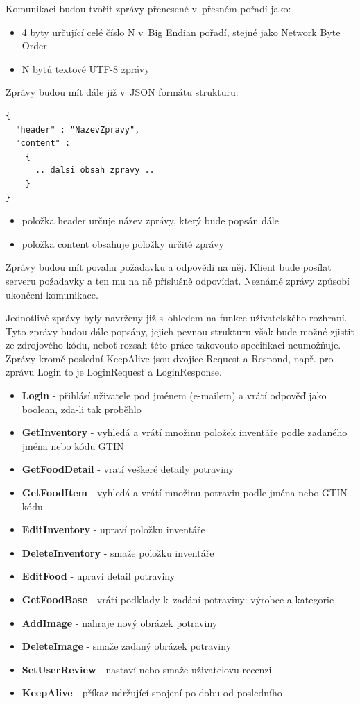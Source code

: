 \documentclass[thesis=B,czech]{FITthesis}[2013/10/20]
\begin{document}
Komunikaci budou tvořit zprávy přenesené v~přesném pořadí jako:

\begin{itemize}
  \item{4 byty určující celé číslo N v~Big Endian pořadí, stejné jako Network Byte Order}
  \item{N bytů textové UTF-8 zprávy}
\end{itemize}

Zprávy budou mít dále již v~JSON formátu strukturu:
\begin{lstlisting}
{
  "header" : "NazevZpravy",
  "content" :
    {
      .. dalsi obsah zpravy ..
    }
}
\end{lstlisting}

\begin{itemize}
  \item{položka header určuje název zprávy, který bude popsán dále}
  \item{položka content obsahuje položky určité zprávy}
\end{itemize}

Zprávy budou mít povahu požadavku a odpovědi na něj. Klient bude posílat serveru požadavky a ten mu na ně příslušně odpovídat. Neznámé zprávy způsobí ukončení komunikace.

Jednotlivé zprávy byly navrženy již s~ohledem na funkce uživatelského rozhraní. Tyto zprávy budou dále popsány, jejich pevnou strukturu však bude možné zjistit ze zdrojového kódu, neboť rozsah této práce takovouto specifikaci neumožňuje. Zprávy kromě poslední KeepAlive jsou dvojice Request a Respond, např. pro zprávu Login to je LoginRequest a LoginResponse.

\begin{itemize}
  \item{\textbf{Login} - přihlásí uživatele pod jménem (e-mailem) a vrátí odpověď jako boolean, zda-li tak proběhlo}
  \item{\textbf{GetInventory} - vyhledá a vrátí množinu položek inventáře podle zadaného jména nebo kódu GTIN}
  \item{\textbf{GetFoodDetail} - vratí veškeré detaily potraviny}
  \item{\textbf{GetFoodItem} - vyhledá a vrátí množinu potravin podle jména nebo GTIN kódu}
  \item{\textbf{EditInventory} - upraví položku inventáře}
  \item{\textbf{DeleteInventory} - smaže položku inventáře}
  \item{\textbf{EditFood} - upraví detail potraviny}
  \item{\textbf{GetFoodBase} - vrátí podklady k~zadání potraviny: výrobce a kategorie}
  \item{\textbf{AddImage} - nahraje nový obrázek potraviny}
  \item{\textbf{DeleteImage} - smaže zadaný obrázek potraviny}
  \item{\textbf{SetUserReview} - nastaví nebo smaže uživatelovu recenzi}
  \item{\textbf{KeepAlive} - příkaz udržující spojení po dobu od posledního}
\end{itemize}
\end{document}

